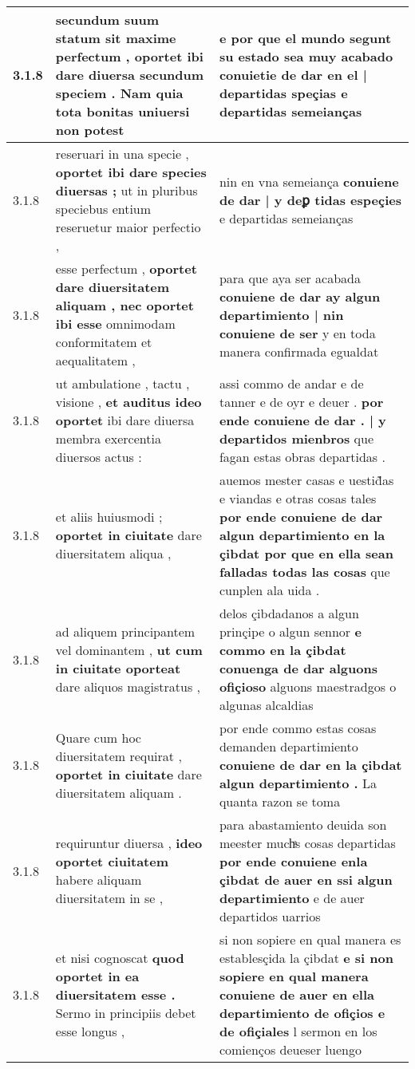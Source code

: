 \begin{tabular}{|p{1cm}|p{6.5cm}|p{6.5cm}|}
3.1.8 & secundum suum statum sit maxime perfectum , \textbf{ oportet ibi dare diuersa secundum speciem . } Nam quia tota bonitas uniuersi non potest & e por que el mundo segunt su estado sea muy acabado \textbf{ conuietie de dar en el | departidas speçias } e departidas semeianças \\\hline
3.1.8 & reseruari in una specie , \textbf{ oportet ibi dare species diuersas ; } ut in pluribus speciebus entium reseruetur maior perfectio , & nin en vna semeiança \textbf{ conuiene de dar | y deꝑ tidas espeçies } e departidas semeianças \\\hline
3.1.8 & esse perfectum , \textbf{ oportet dare diuersitatem aliquam , nec oportet ibi esse } omnimodam conformitatem et aequalitatem , & para que aya ser acabada \textbf{ conuiene de dar ay algun departimiento | nin conuiene de ser } y en toda manera confirmada egualdat \\\hline
3.1.8 & ut ambulatione , tactu , visione , \textbf{ et auditus ideo oportet } ibi dare diuersa membra exercentia diuersos actus : & assi commo de andar e de tanner e de oyr e deuer . \textbf{ por ende conuiene de dar . | y departidos mienbros } que fagan estas obras departidas . \\\hline
3.1.8 & et aliis huiusmodi ; \textbf{ oportet in ciuitate } dare diuersitatem aliqua , & auemos mester casas e uestid̃as e viandas e otras cosas tales \textbf{ por ende conuiene de dar algun departimiento en la çibdat por que en ella sean falladas todas las cosas } que cunplen ala uida . \\\hline
3.1.8 & ad aliquem principantem vel dominantem , \textbf{ ut cum in ciuitate oporteat } dare aliquos magistratus , & delos çibdadanos a algun prinçipe o algun sennor \textbf{ e commo en la çibdat conuenga de dar alguons ofiçioso } alguons maestradgos o algunas alcaldias \\\hline
3.1.8 & Quare cum hoc diuersitatem requirat , \textbf{ oportet in ciuitate } dare diuersitatem aliquam . & por ende commo estas cosas demanden departimiento \textbf{ conuiene de dar en la çibdat algun departimiento . } La quanta razon se toma \\\hline
3.1.8 & requiruntur diuersa , \textbf{ ideo oportet ciuitatem } habere aliquam diuersitatem in se , & para abastamiento deuida son meester muchͣs cosas departidas \textbf{ por ende conuiene enla çibdat de auer en ssi algun departimiento } e de auer departidos uarrios \\\hline
3.1.8 & et nisi cognoscat \textbf{ quod oportet in ea diuersitatem esse . } Sermo in principiis debet esse longus , & si non sopiere en qual manera es establesçida la çibdat \textbf{ e si non sopiere en qual manera conuiene de auer en ella departimiento de ofiçios e de ofiçiales } l sermon en los comienços deueser luengo \\\hline

\end{tabular}
